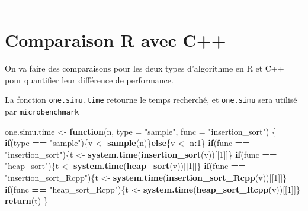 \documentclass[
]{article}
\newenvironment{Shaded}{\begin{snugshade}}{\end{snugshade}}
\newcommand{\AttributeTok}[1]{\textcolor[rgb]{0.13,0.29,0.53}{#1}}
\newcommand{\ControlFlowTok}[1]{\textcolor[rgb]{0.13,0.29,0.53}{\textbf{#1}}}
\newcommand{\DecValTok}[1]{\textcolor[rgb]{0.00,0.00,0.81}{#1}}
\newcommand{\FunctionTok}[1]{\textcolor[rgb]{0.13,0.29,0.53}{\textbf{#1}}}
\newcommand{\NormalTok}[1]{#1}
\newcommand{\OtherTok}[1]{\textcolor[rgb]{0.56,0.35,0.01}{#1}}
\newcommand{\SpecialCharTok}[1]{\textcolor[rgb]{0.81,0.36,0.00}{\textbf{#1}}}
\newcommand{\StringTok}[1]{\textcolor[rgb]{0.31,0.60,0.02}{#1}}
\begin{document}
\begin{center}\rule{0.5\linewidth}{0.5pt}\end{center}

\section{Comparaison R avec C++}\label{comparaison-r-avec-c}

On va faire des comparaisons pour les deux types d'algorithme en R et
C++ pour quantifier leur différence de performance.

La fonction \texttt{one.simu.time} retourne le temps recherché, et
\texttt{one.simu} sera utilisé par \texttt{microbenchmark}

\begin{Shaded}
\begin{Highlighting}[]
\NormalTok{one.simu.time }\OtherTok{\textless{}{-}} \ControlFlowTok{function}\NormalTok{(n, }\AttributeTok{type =} \StringTok{"sample"}\NormalTok{, }\AttributeTok{func =} \StringTok{"insertion\_sort"}\NormalTok{)}
\NormalTok{\{}
  \ControlFlowTok{if}\NormalTok{(type }\SpecialCharTok{==} \StringTok{"sample"}\NormalTok{)\{v }\OtherTok{\textless{}{-}} \FunctionTok{sample}\NormalTok{(n)\}}\ControlFlowTok{else}\NormalTok{\{v }\OtherTok{\textless{}{-}}\NormalTok{ n}\SpecialCharTok{:}\DecValTok{1}\NormalTok{\}}
  \ControlFlowTok{if}\NormalTok{(func }\SpecialCharTok{==} \StringTok{"insertion\_sort"}\NormalTok{)\{t }\OtherTok{\textless{}{-}} \FunctionTok{system.time}\NormalTok{(}\FunctionTok{insertion\_sort}\NormalTok{(v))[[}\DecValTok{1}\NormalTok{]]\}}
  \ControlFlowTok{if}\NormalTok{(func }\SpecialCharTok{==} \StringTok{"heap\_sort"}\NormalTok{)\{t }\OtherTok{\textless{}{-}} \FunctionTok{system.time}\NormalTok{(}\FunctionTok{heap\_sort}\NormalTok{(v))[[}\DecValTok{1}\NormalTok{]]\} }
  \ControlFlowTok{if}\NormalTok{(func }\SpecialCharTok{==} \StringTok{"insertion\_sort\_Rcpp"}\NormalTok{)\{t }\OtherTok{\textless{}{-}} \FunctionTok{system.time}\NormalTok{(}\FunctionTok{insertion\_sort\_Rcpp}\NormalTok{(v))[[}\DecValTok{1}\NormalTok{]]\}}
  \ControlFlowTok{if}\NormalTok{(func }\SpecialCharTok{==} \StringTok{"heap\_sort\_Rcpp"}\NormalTok{)\{t }\OtherTok{\textless{}{-}} \FunctionTok{system.time}\NormalTok{(}\FunctionTok{heap\_sort\_Rcpp}\NormalTok{(v))[[}\DecValTok{1}\NormalTok{]]\}}
  \FunctionTok{return}\NormalTok{(t)}
\NormalTok{\}}


\end{Highlighting}
\end{Shaded}
\end{document}
